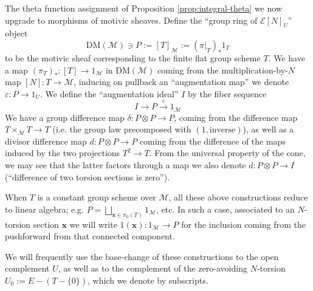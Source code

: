 \documentclass[a4paper,reqno,11pt]{amsart}
\theoremstyle{plain}
\theoremstyle{definition}
\theoremstyle{remark}
\newcommand{\DM}{\mathrm{DM}}
\begin{document}
The theta function assignment of Proposition \ref{prop:integral-theta} we now upgrade to morphisms of motivic sheaves. Define the ``group ring of $\mathcal{E}[N]_U$'' object
\[
    \DM(\mathcal{M}) \ni P :=[T]_{\mathcal{M}}:= (\pi|_T)_*1_T
\]
to be the motivic sheaf corresponding to the finite flat group scheme $T$. We have a map $(\pi_T)_*:[T] \to 1_{\mathcal{M}}$ in $\DM(\mathcal{M})$ coming from the multiplication-by-$N$ map $[N]:T\to \mathcal{M}$, inducing on pullback an ``augmentation map'' we denote $\varepsilon: P \to 1_U$. We define the ``augmentation ideal'' $I$ by the fiber sequence
\[
    I\to P\xrightarrow{\varepsilon} 1_{\mathcal{M}}
\]
We have a group difference map $\delta: P\otimes P \to P$, coming from the difference map $T\times_{\mathcal{M}} T \to T$ (i.e. the group law precomposed with $(1, \mathrm{inverse})$), as well as a divisor difference map $d: P\otimes P\to P$ coming from the difference of the maps induced by the two projections $T^2\to T$. From the universal property of the cone, we may see that the latter factors through a map we also denote $d: P\otimes P \to I$ (``difference of two torsion sections is zero''). 

When $T$ is a constant group scheme over $\mathcal{M}$, all these above constructions reduce to linear algebra; e.g. $P= \bigsqcup_{\mathbf{x} \in \pi_0(T)} 1_{\mathcal{M}}$, etc. In such a case, associated to an $N$-torsion section $\mathbf{x}$ we will write $1(\mathbf{x}):1_{\mathcal{M}} \to P$ for the inclusion coming from the pushforward from that connected component. 

We will frequently use the base-change of these constructions to the open complement $U$, as well as to the complement of the zero-avoiding $N$-torsion $U_0:= E - (T-\{0\})$, which we denote by subscripts.
\end{document}
